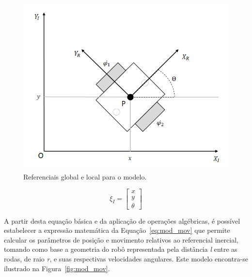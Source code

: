 \documentclass[a4paper]{ifacconf}
\begin{document}
\begin{figure}
\begin{center}
\includegraphics[scale=0.5]{Figuras/mod_cin.png}
\caption{Referenciais global e local para o modelo.}
\label{fig:mod_cin}
\end{center}
\end{figure}

\begin{equation}\label{eq:dof}
\xi_{I} = \begin{bmatrix}
x \\
y \\
\theta
\end{bmatrix}
\end{equation}

A partir desta equação básica e da aplicação de operações algébricas, é possível estabelecer a expressão matemática da Equação~\eqref{eq:mod_mov} que permite calcular os parâmetros de posição e movimento relativos ao referencial inercial, tomando como base a geometria do robô representada pela distância \emph{l} entre as rodas, de raio \emph{r}, e suas respectivas velocidades angulares. Este modelo encontra-se ilustrado na Figura~\ref{fig:mod_mov}.
\end{document}

